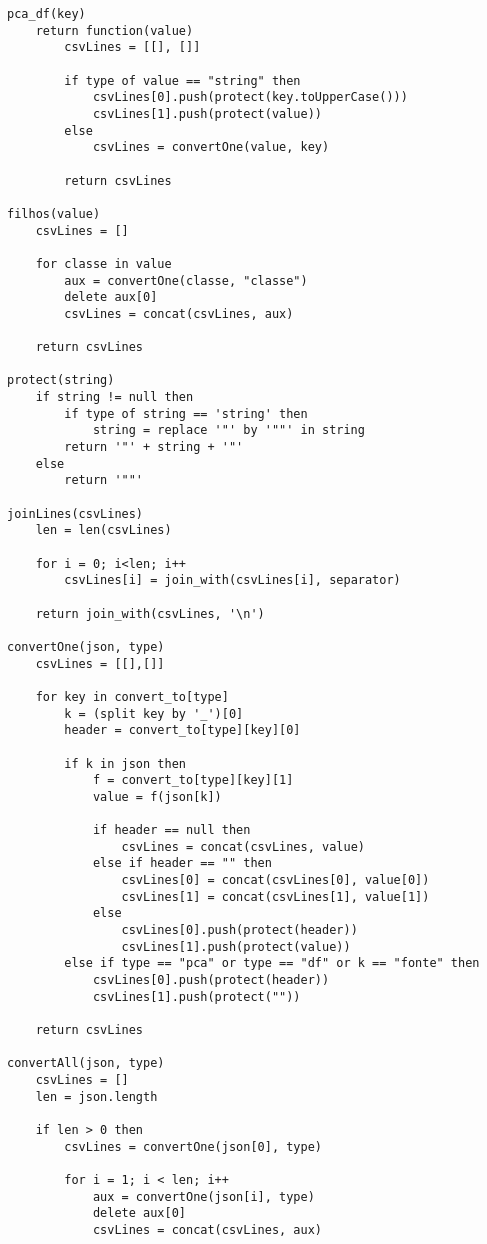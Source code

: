 \begin{lstlisting}[language=pseudocode, caption=Algoritmo de conversão de \acrshort{json} para \acrshort{csv}]
pca_df(key)
    return function(value)
        csvLines = [[], []]

        if type of value == "string" then
            csvLines[0].push(protect(key.toUpperCase()))
            csvLines[1].push(protect(value))
        else
            csvLines = convertOne(value, key)

        return csvLines

filhos(value)
    csvLines = []

    for classe in value
        aux = convertOne(classe, "classe")
        delete aux[0]
        csvLines = concat(csvLines, aux)

    return csvLines

protect(string)
    if string != null then
        if type of string == 'string' then
            string = replace '"' by '""' in string
        return '"' + string + '"'
    else
        return '""'

joinLines(csvLines)
    len = len(csvLines)

    for i = 0; i<len; i++
        csvLines[i] = join_with(csvLines[i], separator)

    return join_with(csvLines, '\n')

convertOne(json, type)
    csvLines = [[],[]]

    for key in convert_to[type]
        k = (split key by '_')[0]
        header = convert_to[type][key][0]

        if k in json then
            f = convert_to[type][key][1]
            value = f(json[k])

            if header == null then
                csvLines = concat(csvLines, value)
            else if header == "" then
                csvLines[0] = concat(csvLines[0], value[0])
                csvLines[1] = concat(csvLines[1], value[1])
            else
                csvLines[0].push(protect(header))
                csvLines[1].push(protect(value))
        else if type == "pca" or type == "df" or k == "fonte" then
            csvLines[0].push(protect(header))
            csvLines[1].push(protect(""))

    return csvLines

convertAll(json, type)
    csvLines = []
    len = json.length

    if len > 0 then
        csvLines = convertOne(json[0], type)

        for i = 1; i < len; i++
            aux = convertOne(json[i], type)
            delete aux[0]
            csvLines = concat(csvLines, aux)


\end{lstlisting}
